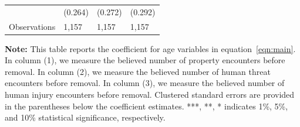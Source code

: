 \documentclass[english,12pt]{article}
\begin{document}
\begin{table}[H]
\begin{tabular}{@{}llll@{}}
                    &     (0.264)   &     (0.272)   &     (0.292)   \\
        Observations & 1,157    &  1,157       & 1,157        \\\bottomrule
    \end{tabular}
    \begin{minipage}{.9\textwidth}
            \vspace{1em}
    \footnotesize{{\bf{Note:}} This table reports the coefficient for age variables in equation~\ref{eqn:main}. In column (1), we measure the believed number of property encounters before removal. In column (2), we measure the believed number of human threat encounters before removal. In column (3), we measure the believed number of human injury encounters before removal. Clustered standard errors are provided in the parentheses below the coefficient estimates. ***, **, * indicates 1\%, 5\%, and 10\% statistical significance, respectively.}
    \label{tab: bel_age}
    \end{minipage}
\end{table}
\end{document}
